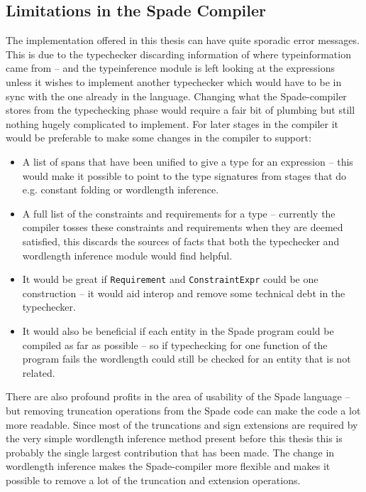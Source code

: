 \documentclass[msc,lith,english]{liuthesis}
\begin{document}
\subsection{Limitations in the Spade Compiler}
The implementation offered in this thesis can have quite sporadic error messages. This is due to the typechecker discarding information of where typeinformation came from -- and the typeinference module is left looking at the expressions unless it wishes to implement another typechecker which would have to be in sync with the one already in the language. Changing what the Spade-compiler stores from the typechecking phase would require a fair bit of plumbing but still nothing hugely complicated to implement. For later stages in the compiler it would be preferable to make some changes in the compiler to support:
\begin{itemize}
  \item A list of spans that have been unified to give a type for an expression -- this would make it possible to point to the type signatures from stages that do e.g. constant folding or wordlength inference.
  \item A full list of the constraints and requirements for a type -- currently the compiler tosses these constraints and requirements when they are deemed satisfied, this discards the sources of facts that both the typechecker and wordlength inference module would find helpful.
  \item It would be great if \verb+Requirement+ and \verb+ConstraintExpr+ could be one construction -- it would aid interop and remove some technical debt in the typechecker.
  \item It would also be beneficial if each entity in the Spade program could be compiled as far as possible -- so if typechecking for one function of the program fails the wordlength could still be checked for an entity that is not related.
\end{itemize}

There are also profound profits in the area of usability of the Spade language -- but removing truncation operations from the Spade code can make the code a lot more readable. Since most of the truncations and sign extensions are required by the very simple wordlength inference method present before this thesis this is probably the single largest contribution that has been made. The change in wordlength inference makes the Spade-compiler more flexible and makes it possible to remove a lot of the truncation and extension operations.
\end{document}

